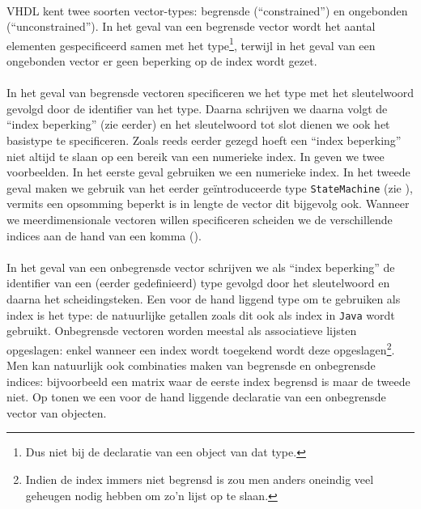 \paragraph{}
VHDL kent twee soorten vector-types: begrensde (``constrained'') en ongebonden (``unconstrained''). In het geval van een begrensde vector wordt het aantal elementen gespecificeerd samen met het type\footnote{Dus niet bij de declaratie van een object van dat type.}, terwijl in het geval van een ongebonden vector er geen beperking op de index wordt gezet.

\paragraph{}
In het geval van begrensde vectoren specificeren we het type met het sleutelwoord  gevolgd door de identifier van het type. Daarna schrijven we   daarna volgt de ``index beperking'' (zie eerder) en het sleutelwoord  tot slot dienen we ook het basistype te specificeren. Zoals reeds eerder gezegd hoeft een ``index beperking'' niet altijd te slaan op een bereik van een numerieke index. In  geven we twee voorbeelden. In het eerste geval gebruiken we een numerieke index. In het tweede geval maken we gebruik van het eerder ge\"introduceerde type \texttt{StateMachine} (zie ), vermits een opsomming beperkt is in lengte de vector dit bijgevolg ook. Wanneer we meerdimensionale vectoren willen specificeren scheiden we de verschillende indices aan de hand van een komma (\vhdltermen{,}).

\paragraph{}
In het geval van een onbegrensde vector schrijven we als ``index beperking'' de identifier van een (eerder gedefinieerd) type gevolgd door het  sleutelwoord en daarna het \vhdltermen{<>} scheidingsteken. Een voor de hand liggend type om te gebruiken als index is het  type: de natuurlijke getallen zoals dit ook als index in \texttt{Java} wordt gebruikt. Onbegrensde vectoren worden meestal als associatieve lijsten opgeslagen: enkel wanneer een index wordt toegekend wordt deze opgeslagen\footnote{Indien de index immers niet begrensd is zou men anders oneindig veel geheugen nodig hebben om zo'n lijst op te slaan.}. Men kan natuurlijk ook combinaties maken van begrensde en onbegrensde indices: bijvoorbeeld een matrix waar de eerste index begrensd is maar de tweede niet. Op  tonen we een voor de hand liggende declaratie van een onbegrensde vector van  objecten.

